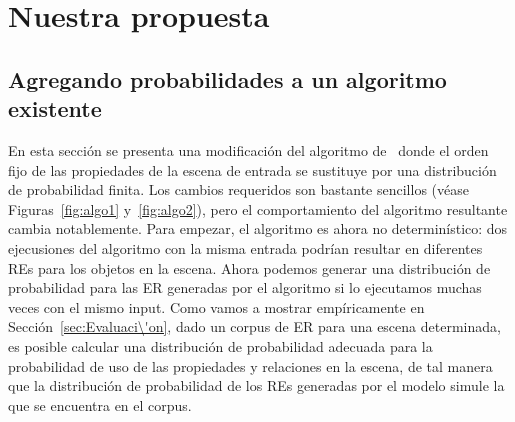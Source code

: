 \chapter{Nuestra propuesta}
\label{sec:algoritmo}
\section{Agregando probabilidades a un algoritmo existente}



En esta secci\'on se presenta una modificaci\'on del algoritmo
de~\cite{arec2:2008:Areces} donde el orden fijo de las propiedades de
la escena de entrada se sustituye por una distribuci\'on de probabilidad finita. Los
cambios requeridos son bastante sencillos (v\'ease
Figuras~\ref{fig:algo1} y~\ref{fig:algo2}), pero el comportamiento del algoritmo 
resultante cambia notablemente. Para empezar, el
algoritmo es ahora no determin\'istico: dos ejecusiones del algoritmo con la
misma entrada podr\'{i}an resultar en diferentes REs para los objetos en la escena.
Ahora podemos generar una distribuci\'on de probabilidad
para las ER generadas por el algoritmo si lo ejecutamos muchas veces con
el mismo input. Como vamos a mostrar emp\'{i}ricamente en
Secci\'on~\ref{sec:Evaluaci\'on}, dado un corpus de ER para una escena determinada,
es posible calcular una distribuci\'on de probabilidad adecuada para la
probabilidad de uso de las propiedades y relaciones en la escena, de tal manera que
la distribuci\'on de probabilidad de los REs generadas por el modelo
simule la que se encuentra en el corpus.


